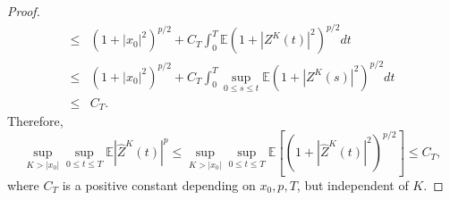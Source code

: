 \documentclass[preprint,12pt,compress]{elsarticle}
\begin{document}
\begin{proof}
\begin{equation*}
\begin{split}
	\le& {\left( {1 + {{\left| {{x_0}} \right|}^2}} \right)^{p/2}} + C_T\int_0^T \mathbb{E}{{{\left( {1 + {{\left| {Z^K(t)} \right|}^2}} \right)}^{p/2}}dt} \\
	\le& {\left( {1 + {{\left| {{x_0}} \right|}^2}} \right)^{p/2}} + C_T\int_0^T {\mathop {\sup }\limits_{0 \le s \le t} \mathbb{E}{{\left( {1 + {{\left| {{Z}^K(s)} \right|}^2}} \right)}^{p/2}}dt} \\
	\le& C_T .
\end{split}
\end{equation*}
Therefore, 
\begin{equation}  \label{a23}
	\mathop {\sup }\limits_{K > |{x_0}|} \mathop {\sup }\limits_{0 \le t \le T} \mathbb{E}{\left| {{{\hat Z}^K}(t)} \right|^p} \le \mathop {\sup }\limits_{K > |{x_0}|} \mathop {\sup }\limits_{0 \le t \le T} \mathbb{E}\left[ {{{\left( {1 + {{\left| {{{\hat Z}^K}(t)} \right|}^2}} \right)}^{p/2}}} \right] \le {C_T} ,
\end{equation}
where $C_T$ is a positive constant depending on $x_0, p, T$, but independent of $K$.


\end{proof}
\end{document}
